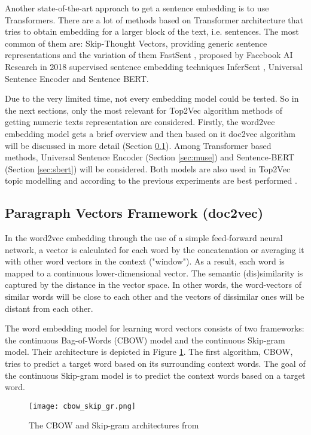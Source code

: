 \documentclass[fontsize=12pt,a4paper,twoside,openany]{scrbook}
\begin{document}
Another state-of-the-art approach to get a sentence embedding is to use Transformers. There are a lot of methods based on Transformer architecture that tries to obtain embedding for a larger block of the text, i.e. sentences. The most common of them are: Skip-Thought Vectors, providing generic sentence representations \parencite{Kiros15} and the variation of them FastSent \parencite{Hill16}, proposed by Facebook AI Research in 2018 supervised sentence embedding techniques InferSent \parencite{Conneau17}, Universal Sentence Encoder and Sentence BERT.

Due to the very limited time, not every embedding model could be tested. So in the next sections, only the most relevant for Top2Vec algorithm methods of getting numeric texts representation are considered. Firstly, the word2vec embedding model gets a brief overview and then based on it doc2vec algorithm will be discussed in more detail (Section  \ref{sec:doc2vec}). Among Transformer based methods, Universal Sentence Encoder (Section \ref{sec:muse}) and Sentence-BERT (Section \ref{sec:sbert}) will be considered. Both models are also used in Top2Vec topic modelling and according to the previous experiments are best performed \parencite{Wang20}.

\subsection{Paragraph Vectors Framework (doc2vec)}
\label{sec:doc2vec}

In the word2vec embedding through the use of a simple feed-forward neural network, a vector is calculated for each word by the concatenation or averaging it with other word vectors in the context ("window"). As a result, each word is mapped to a continuous lower-dimensional vector. The semantic (dis)similarity is captured by the distance in the vector space. In other words, the word-vectors of similar words will be close to each other and the vectors of dissimilar ones will be distant from each other.

The word embedding model for learning word vectors consists of two frameworks: the continuous Bag-of-Words (CBOW) model and the continuous Skip-gram model. Their architecture is depicted in Figure \ref{fig:cbow_skip_gr}. The first algorithm, CBOW,  tries to predict a target word based on its surrounding context words. The goal of the continuous Skip-gram model is to predict the context words based on a target word.

\begin{figure}[h]
\centering
\texttt{[image: cbow\_skip\_gr.png]}
\caption{The CBOW and Skip-gram architectures from \parencite{TMikolov13}}
\label{fig:cbow_skip_gr}
\end{figure}
\end{document}
